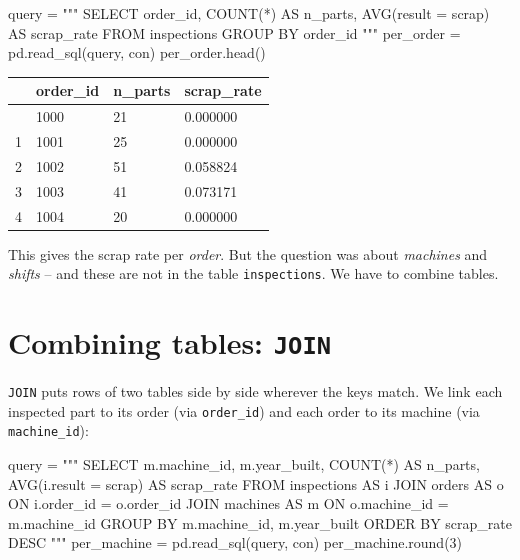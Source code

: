 \documentclass[
  letterpaper,
  DIV=11,
  numbers=noendperiod]{scrreprt}
\newenvironment{Shaded}{\begin{snugshade}}{\end{snugshade}}
\newcommand{\BuiltInTok}[1]{\textcolor[rgb]{0.00,0.23,0.31}{#1}}
\newcommand{\DecValTok}[1]{\textcolor[rgb]{0.68,0.00,0.00}{#1}}
\newcommand{\NormalTok}[1]{\textcolor[rgb]{0.00,0.23,0.31}{#1}}
\newcommand{\OperatorTok}[1]{\textcolor[rgb]{0.37,0.37,0.37}{#1}}
\newcommand{\StringTok}[1]{\textcolor[rgb]{0.13,0.47,0.30}{#1}}
\begin{document}
\begin{Shaded}
\begin{Highlighting}[]
\NormalTok{query }\OperatorTok{=} \StringTok{"""}
\StringTok{SELECT order\_id,}
\StringTok{       COUNT(*)                   AS n\_parts,}
\StringTok{       AVG(result = \textquotesingle{}scrap\textquotesingle{})      AS scrap\_rate}
\StringTok{FROM inspections}
\StringTok{GROUP BY order\_id}
\StringTok{"""}
\NormalTok{per\_order }\OperatorTok{=}\NormalTok{ pd.read\_sql(query, con)}
\NormalTok{per\_order.head()}
\end{Highlighting}
\end{Shaded}

\begin{longtable}[]{@{}llll@{}}
\toprule\noalign{}
& order\_id & n\_parts & scrap\_rate \\
\midrule\noalign{}
\endhead
\bottomrule\noalign{}
\endlastfoot
0 & 1000 & 21 & 0.000000 \\
1 & 1001 & 25 & 0.000000 \\
2 & 1002 & 51 & 0.058824 \\
3 & 1003 & 41 & 0.073171 \\
4 & 1004 & 20 & 0.000000 \\
\end{longtable}

This gives the scrap rate per \emph{order}. But the question was about
\emph{machines} and \emph{shifts} -- and these are not in the table
\texttt{inspections}. We have to combine tables.

\section{\texorpdfstring{Combining tables:
\texttt{JOIN}}{Combining tables: JOIN}}\label{combining-tables-join}

\texttt{JOIN} puts rows of two tables side by side wherever the keys
match. We link each inspected part to its order (via \texttt{order\_id})
and each order to its machine (via \texttt{machine\_id}):

\begin{Shaded}
\begin{Highlighting}[]
\NormalTok{query }\OperatorTok{=} \StringTok{"""}
\StringTok{SELECT m.machine\_id, m.year\_built,}
\StringTok{       COUNT(*)                AS n\_parts,}
\StringTok{       AVG(i.result = \textquotesingle{}scrap\textquotesingle{}) AS scrap\_rate}
\StringTok{FROM inspections AS i}
\StringTok{JOIN orders   AS o ON i.order\_id   = o.order\_id}
\StringTok{JOIN machines AS m ON o.machine\_id = m.machine\_id}
\StringTok{GROUP BY m.machine\_id, m.year\_built}
\StringTok{ORDER BY scrap\_rate DESC}
\StringTok{"""}
\NormalTok{per\_machine }\OperatorTok{=}\NormalTok{ pd.read\_sql(query, con)}
\NormalTok{per\_machine.}\BuiltInTok{round}\NormalTok{(}\DecValTok{3}\NormalTok{)}
\end{Highlighting}
\end{Shaded}
\end{document}
